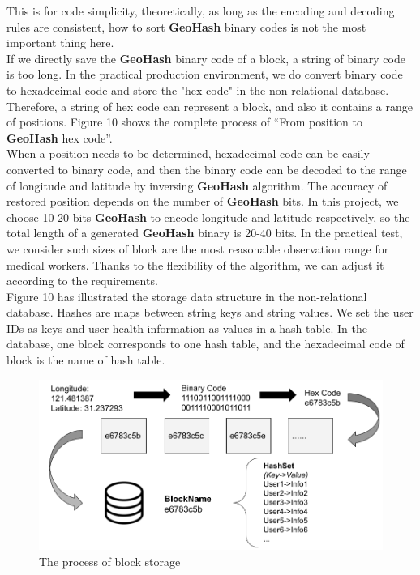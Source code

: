 \documentclass[sigplan,screen]{acmart}
\begin{document}
This is for code simplicity, theoretically, as long as the encoding and decoding rules are consistent, how to sort \textbf{GeoHash} binary codes is not the most important thing here.
\\
If we directly save the \textbf{GeoHash} binary code of a block, a string of binary code is too long.
In the practical production environment, we do convert binary code to hexadecimal code and store the "hex code" in the non-relational database.
Therefore, a string of hex code can represent a block, and also it contains a range of positions.
Figure 10 shows the complete process of ``From position to \textbf{GeoHash} hex code''.
\\
When a position needs to be determined, hexadecimal code can be easily converted to binary code, and then the binary code can be decoded to the range of longitude and latitude by inversing \textbf{GeoHash} algorithm.
The accuracy of restored position depends on the number of \textbf{GeoHash} bits.
In this project, we choose 10-20 bits \textbf{GeoHash} to encode longitude and latitude respectively, so the total length of a generated \textbf{GeoHash} binary is 20-40 bits.
In the practical test, we consider such sizes of block are the most reasonable observation range for medical workers.
Thanks to the flexibility of the algorithm, we can adjust it according to the requirements.
\\
Figure 10 has illustrated the storage data structure in the non-relational database.
Hashes are maps between string keys and string values.
We set the user IDs as keys and user health information as values in a hash table.
In the database, one block corresponds to one hash table, and the hexadecimal code of block is the name of hash table.
\begin{figure}[htb]
	\centering\includegraphics[width=\linewidth]{block-storage.png}
	\caption{The process of block storage}
\end{figure}
\end{document}
